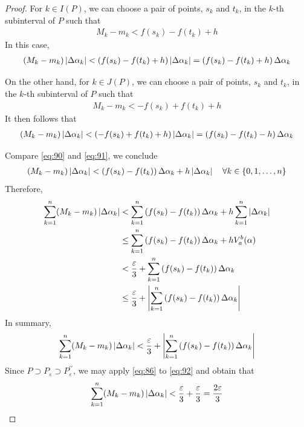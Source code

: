 \documentclass[thmcnt=section, 12pt]{my-elegantbook}
\begin{document}
\begin{proof}
    For $k \in I(P)$, we can choose a pair of points, $s_k$ and $t_k$, in the $k$-th subinterval of $P$ such that 
    \begin{align*}
        M_k - m_k < f(s_k) - f(t_k) + h
    \end{align*}
    In this case, 
    \begin{align}
        (M_k - m_k)\left\lvert \Delta\alpha_k \right\rvert
        < \left(f(s_k) - f(t_k) + h\right)\left\lvert \Delta\alpha_k \right\rvert
        =  \left(f(s_k) - f(t_k) + h\right) \Delta\alpha_k
        \label{eq:90}
    \end{align}

    On the other hand, for $k \in J(P)$, we can choose a pair of points, $s_k$ and $t_k$, in the $k$-th subinterval of $P$ such that 
    \begin{align*}
        M_k - m_k < -f(s_k) + f(t_k) + h
    \end{align*}
    It then follows that
    \begin{align}
        (M_k - m_k)\left\lvert \Delta\alpha_k \right\rvert
        < \left(-f(s_k) + f(t_k) + h\right)\left\lvert \Delta\alpha_k \right\rvert
        =  \left(f(s_k) - f(t_k) - h\right) \Delta\alpha_k
        \label{eq:91}
    \end{align}

    Compare \eqref{eq:90} and \eqref{eq:91}, we conclude
    \begin{align*}
        (M_k - m_k)\left\lvert \Delta\alpha_k \right\rvert
        < \left(f(s_k) - f(t_k)\right) \Delta\alpha_k
        + h \left\lvert \Delta\alpha_k \right\rvert
        \quad \forall k \in \left\{0, 1, \ldots, n\right\}
    \end{align*}
    Therefore, 
    \begin{align*}
        \sum_{k=1}^n (M_k - m_k) \left\lvert \Delta\alpha_k \right\rvert
        &< \sum_{k=1}^n \left(f(s_k) - f(t_k)\right) \Delta\alpha_k + h \sum_{k=1}^n \left\lvert \Delta\alpha_k \right\rvert \\ 
        &\leq \sum_{k=1}^n \left(f(s_k) - f(t_k)\right) \Delta\alpha_k + h V_a^b (\alpha) \\ 
        &< \frac{\varepsilon}{3} + \sum_{k=1}^n \left(f(s_k) - f(t_k)\right)\Delta\alpha_k \\ 
        &\leq \frac{\varepsilon}{3} + \left\lvert \sum_{k=1}^n \left(f(s_k) - f(t_k)\right)\Delta\alpha_k \right\rvert
    \end{align*}
    In summary,
    \begin{align}
        \sum_{k=1}^n (M_k - m_k) \left\lvert \Delta\alpha_k \right\rvert
        < \frac{\varepsilon}{3} + \left\lvert \sum_{k=1}^n \left(f(s_k) - f(t_k)\right)\Delta\alpha_k \right\rvert
        \label{eq:92}
    \end{align}
    Since $P \supset P_\varepsilon \supset P^{\prime\prime}_\varepsilon$, we may apply \eqref{eq:86} to \eqref{eq:92} and obtain that 
    \begin{align}
        \sum_{k=1}^n (M_k - m_k) \left\lvert \Delta\alpha_k \right\rvert
        < \frac{\varepsilon}{3} + \frac{\varepsilon}{3}
        = \frac{2\varepsilon}{3}
        \label{eq:93}
    \end{align}


\end{proof}
\end{document}
